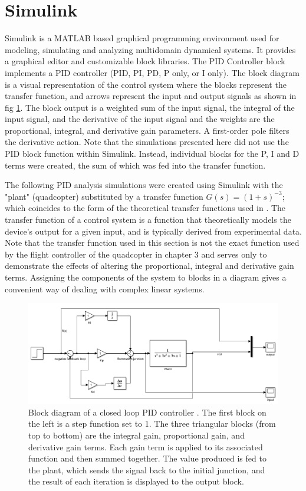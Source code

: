 \documentclass[11pt]{ucthesis}
\begin{document}
\section{Simulink}
Simulink \cite{documentationsimulation} is a MATLAB based graphical programming environment used for modeling, simulating and analyzing multidomain dynamical systems. It provides a graphical editor and customizable block libraries. The PID Controller block implements a PID controller (PID, PI, PD, P only, or I only). The block diagram is a visual representation of the control system where the blocks represent the transfer function, and arrows represent the input and output signals as shown in fig \ref{fig:pidDiagram}. The block output is a weighted sum of the input signal, the integral of the input signal, and the derivative of the input signal and the weights are the proportional, integral, and derivative gain parameters. A first-order pole filters the derivative action. Note that the simulations presented here did not use the PID block function within Simulink. Instead, individual blocks for the P, I and D terms were created, the sum of which was fed into the transfer function.

The following PID analysis simulations were created using Simulink with the "plant" (quadcopter) substituted by a transfer function $G(s)=(1+s)^{-3}$; which coincides to the form of the theoretical transfer functions used in \cite{reizenstein2017position,kugelberg2016black,aastrom2010feedback}. The transfer function of a control system is a function that theoretically models the device's output for a given input, and is typically derived from experimental data. Note that the transfer function used in this section is not the exact function used by the flight controller of the quadcopter in chapter 3 and serves only to demonstrate the effects of altering the proportional, integral and derivative gain terms.  Assigning the components of the system to blocks in a diagram gives a convenient way of dealing with complex linear systems.  
\begin{figure}[H]
	\centering
	\includegraphics[width=1.0\textwidth]{pidDiagram}
	\caption[PID Control Block Diagram]{Block diagram of a closed loop PID controller \cite{documentationsimulation}. The first block on the left is a step function set to 1. The three triangular blocks (from top to bottom) are the integral gain, proportional gain, and derivative gain terms. Each gain term is applied to its associated function and then summed together. The value produced is fed to the plant, which sends the signal back to the initial junction, and the result of each iteration is displayed to the output block.}
	\label{fig:pidDiagram}
\end{figure}
\end{document}
